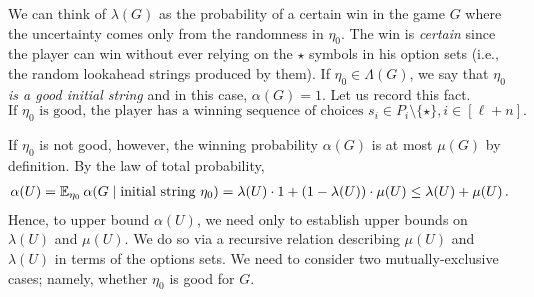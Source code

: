     We can think of $\lambda(G)$ as 
    the probability of a certain win in the game $G$ 
    where the uncertainty comes only from the randomness in $\eta_0$. 
    The win is \emph{certain} since the player can win 
    without ever relying on the $\star$ symbols in his option sets 
    (i.e., the random lookahead strings produced by them).
    If $\eta_0 \in \Lambda(G)$,
    we say that \emph{$\eta_0$ is a good initial string} 
    and in this case, $\alpha(G) = 1$. 
    Let us record this fact.    
    \begin{equation}\label{eq:eta-good}
        \text{If $\eta_0$ is good, the player has 
        a winning sequence of choices 
        $s_i \in P_i \setminus \{\star\}, i \in [\ell + n]$.}
    \end{equation}

    If $\eta_0$ is not good, however, 
    the winning probability $\alpha(G)$ is at most $\mu(G)$ by definition. 
    By the law of total probability, 
    \begin{align}\label{eq:alpha-lambda-mu-lookahead}
        \alpha(U) 
        = \operatorname{\mathbb{E}}_{\eta_0} \alpha(G \mid \text{initial string $\eta_0$}) 
        = \lambda(U)\cdot 1 + (1 - \lambda(U)) \cdot \mu(U) 
        \leq \lambda(U) + \mu(U)\,.
    \end{align}
    Hence, to upper bound $\alpha(U)$, 
    we need only to establish upper bounds on $\lambda(U)$ and $\mu(U)$. 
    We do so via a recursive relation describing $\mu(U)$ and $\lambda(U)$ 
    in terms of the options sets. 
    We need to consider two mutually-exclusive cases; namely, 
    whether $\eta_0$ is good for $G$.


